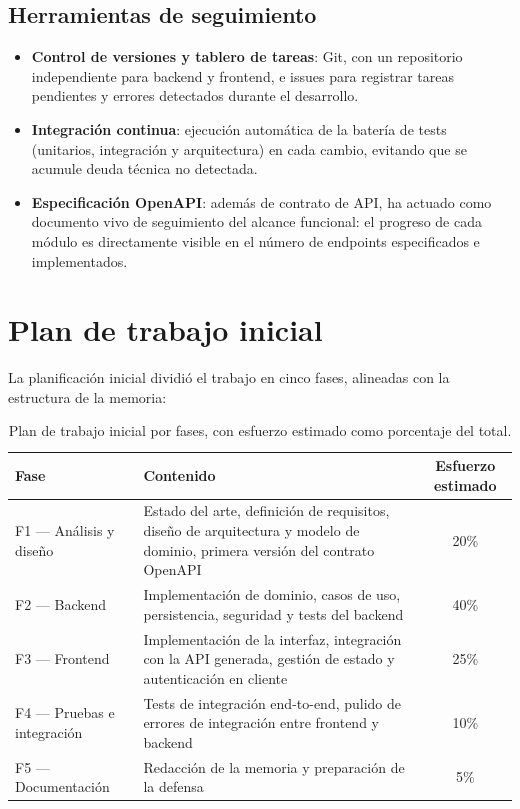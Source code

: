 \subsection{Herramientas de seguimiento}

\begin{itemize}
  \item \textbf{Control de versiones y tablero de tareas}: Git, con un
    repositorio independiente para backend y frontend, e issues para registrar
    tareas pendientes y errores detectados durante el desarrollo.
  \item \textbf{Integración continua}: ejecución automática de la batería de
    tests (unitarios, integración y arquitectura) en cada cambio, evitando que
    se acumule deuda técnica no detectada.
  \item \textbf{Especificación OpenAPI}: además de contrato de API, ha actuado
    como documento vivo de seguimiento del alcance funcional: el progreso de
    cada módulo es directamente visible en el número de endpoints especificados
    e implementados.
\end{itemize}

\section{Plan de trabajo inicial}
\label{sec:plan_inicial}

La planificación inicial dividió el trabajo en cinco fases, alineadas con la
estructura de la memoria:

\begin{table}[ht]
\centering
\begin{tabularx}{\textwidth}{lXc}
\hline
\textbf{Fase} & \textbf{Contenido} & \textbf{Esfuerzo estimado} \\
\hline
F1 — Análisis y diseño & Estado del arte, definición de requisitos, diseño de
  arquitectura y modelo de dominio, primera versión del contrato OpenAPI &
  20\% \\
F2 — Backend & Implementación de dominio, casos de uso, persistencia,
  seguridad y tests del backend & 40\% \\
F3 — Frontend & Implementación de la interfaz, integración con la API
  generada, gestión de estado y autenticación en cliente & 25\% \\
F4 — Pruebas e integración & Tests de integración end-to-end, pulido de
  errores de integración entre frontend y backend & 10\% \\
F5 — Documentación & Redacción de la memoria y preparación de la defensa &
  5\% \\
\hline
\end{tabularx}
\caption{Plan de trabajo inicial por fases, con esfuerzo estimado como
  porcentaje del total.}
\label{tab:plan_inicial}
\end{table}

